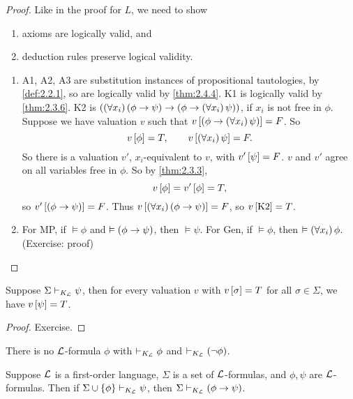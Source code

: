 \begin{proof}
Like in the proof for $ L $, we need to show
\begin{enumerate}
\item axioms are logically valid, and
\item deduction rules preserve logical validity.
\end{enumerate}
\begin{enumerate}
\item A1, A2, A3 are substitution instances of propositional tautologies, by \ref{def:2.2.1}, so are logically valid by \ref{thm:2.4.4}. K1 is logically valid by \ref{thm:2.3.6}. K2 is $ \impb{\fab{x_i}\impb{\phi}{\psi}}{\impb{\phi}{\fab{x_i}\psi}} $, if $ x_i $ is not free in $ \phi $. Suppose we have valuation $ v $ such that $ v\sb{\impb{\phi}{\fab{x_i}\psi}} = F $. So
$$ v\sb{\phi} = T, \qquad v\sb{\fab{x_i}\psi} = F. $$
So there is a valuation $ v' $, $ x_i $-equivalent to $ v $, with $ v'\sb{\psi} = F $. $ v $ and $ v' $ agree on all variables free in $ \phi $. So by \ref{thm:2.3.3},
$$ v\sb{\phi} = v'\sb{\phi} = T, $$
so $ v'\sb{\impb{\phi}{\psi}} = F $. Thus $ v\sb{\fab{x_i}\impb{\phi}{\psi}} = F $, so $ v\sb{\text{K2}} = T $.
\item For MP, if $ \vDash \phi $ and $ \vDash \impb{\phi}{\psi} $, then $ \vDash \psi $. For Gen, if $ \vDash \phi $, then $ \vDash \fab{x_i}\phi $. (Exercise: proof)
\end{enumerate}
\end{proof}

\pagebreak

\begin{example}
\label{eg:2.4.6}
Suppose $ \Sigma \vdash_{K_\LL} \psi $, then for every valuation $ v $ with $ v\sb{\sigma} = T $ for all $ \sigma \in \Sigma $, we have $ v\sb{\psi} = T $.
\end{example}

\begin{proof}
Exercise.
\end{proof}

\begin{corollary}
\label{cor:2.4.7}
There is no $ \LL $-formula $ \phi $ with $ \vdash_{K_\LL} \phi $ and $ \vdash_{K_\LL} \notb{\phi} $.
\end{corollary}

\begin{theorem}
Suppose $ \LL $ is a first-order language, $ \Sigma $ is a set of $ \LL $-formulas, and $ \phi, \psi $ are $ \LL $-formulas. Then if $ \Sigma \cup \cb{\phi} \vdash_{K_\LL} \psi $, then $ \Sigma \vdash_{K_\LL} \impb{\phi}{\psi} $.
\end{theorem}

